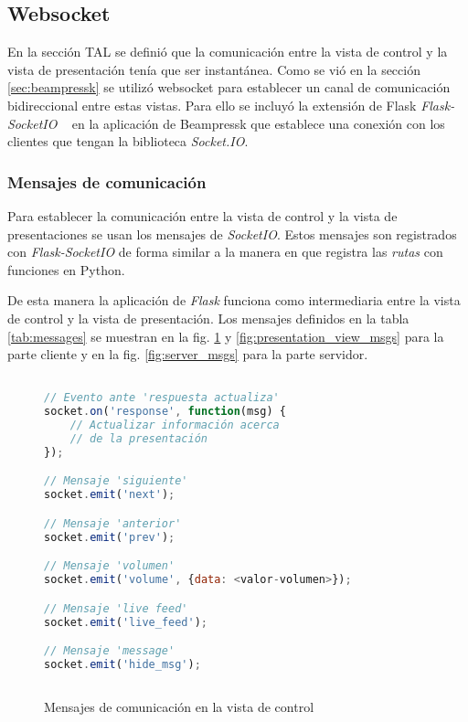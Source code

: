 		\subsection{Websocket} %
		\label{sub:websocket}

		En la sección TAL se definió que la comunicación entre la vista de control y la vista de presentación tenía que ser instantánea. Como se vió en la sección \ref{sec:beampressk} se utilizó websocket para establecer un canal de comunicación bidireccional entre estas vistas. Para ello se incluyó la extensión de Flask \textit{Flask-SocketIO} ~\cite{flasksocket} en la aplicación de Beampressk que establece una conexión con los clientes que tengan la biblioteca \textit{Socket.IO}.

			\subsubsection{Mensajes de comunicación} %
			\label{ssub:mensajes_de_comunicacion}
				Para establecer la comunicación entre la vista de control y la vista de presentaciones se usan los mensajes de \textit{SocketIO}. Estos mensajes son registrados con \textit{Flask-SocketIO} de forma similar a la manera en que registra las \textit{rutas} con funciones en Python. 

				De esta manera la aplicación de \textit{Flask} funciona como intermediaria entre la vista de control y la vista de presentación. Los mensajes definidos en la tabla \ref{tab:messages} se muestran en la fig. \ref{fig:control_view_msgs} y \ref{fig:presentation_view_msgs} para la parte cliente y en la fig. \ref{fig:server_msgs} para la parte servidor.


			\begin{figure}[htb]%
				\begin{lstlisting}[language=JavaScript]%

// Evento ante 'respuesta actualiza'
socket.on('response', function(msg) {
    // Actualizar información acerca 
    // de la presentación
}); 

// Mensaje 'siguiente'
socket.emit('next');

// Mensaje 'anterior'
socket.emit('prev');

// Mensaje 'volumen'
socket.emit('volume', {data: <valor-volumen>});

// Mensaje 'live feed'
socket.emit('live_feed');

// Mensaje 'message'
socket.emit('hide_msg');
  
				\end{lstlisting}
			\caption{Mensajes de comunicación en la vista de control}
			\label{fig:control_view_msgs}
			\end{figure}


